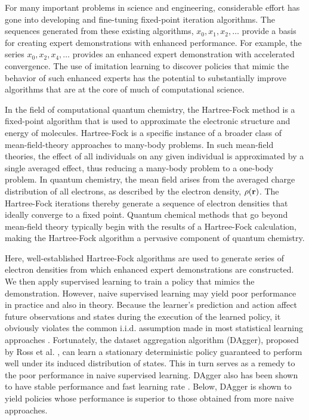 \documentclass[twoside,11pt]{article}
\begin{document}

For many important problems in science and engineering, considerable effort has gone into developing and fine-tuning fixed-point iteration algorithms. The sequences generated from these existing algorithms, $x_0, x_1, x_2, \ldots$  provide a basis for creating expert demonstrations with enhanced performance. For example, the series $x_0, x_2, x_4, \ldots$ provides an enhanced expert demonstration with accelerated convergence. The use of imitation learning to discover policies that mimic the behavior of such enhanced experts has the potential to substantially improve algorithms that are at the core of much of computational science.

In the field of computational quantum chemistry, the Hartree-Fock method is a fixed-point algorithm that is used to approximate the electronic structure and energy of molecules. Hartree-Fock is a specific instance of a broader class of mean-field-theory approaches to many-body problems. In such mean-field theories, the effect of all individuals on any given individual is approximated by a single averaged effect, thus reducing a many-body problem to a one-body problem. In quantum chemistry, the mean field arises from the averaged charge distribution of all electrons, as described by the electron density, $\rho({\bf r})$. The Hartree-Fock iterations thereby generate a sequence of electron densities that ideally converge to a fixed point. Quantum chemical methods that go beyond mean-field theory typically begin with the results of a Hartree-Fock calculation, making the Hartree-Fock algorithm a pervasive component of quantum chemistry.\cite{Some authoritative review of electronic structure theory}

Here, well-established Hartree-Fock algorithms are used to generate series of electron densities from which enhanced expert demonstrations are constructed. We then apply supervised learning to train a policy that mimics the demonstration. However, naive supervised learning may yield poor performance in practice and also in theory.  Because the learner's prediction and action affect future observations and states during the execution of the learned policy, it obviously violates the common i.i.d. assumption made in most statistical learning approaches \citep{Ross}. Fortunately, the dataset aggregation algorithm (DAgger), proposed by Ross et al. \citep{DAgger}, can learn a stationary deterministic policy guaranteed to perform well under its induced distribution of states. This in turn serves as a remedy to the poor performance in naive supervised learning. DAgger also has been shown to have stable performance and fast learning rate \citep{DAggerCompare}. Below, DAgger is shown to yield policies whose performance is superior to those obtained from more naive approaches. 
\end{document}

